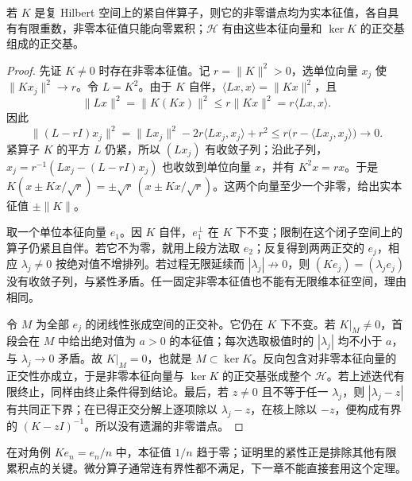 \begin{theorem}[紧自伴算子的谱结构]
若 \(K\) 是复 Hilbert 空间上的紧自伴算子，则它的非零谱点均为实本征值，各自具有有限重数，非零本征值只能向零累积；\(\mathcal H\) 有由这些本征向量和 \(\ker K\) 的正交基组成的正交基。
\end{theorem}

\begin{proof}
先证 \(K\ne0\) 时存在非零本征值。记 \(r=\|K\|^2>0\)，选单位向量 \(x_j\) 使 \(\|Kx_j\|^2\to r\)。令 \(L=K^2\)。由于 \(K\) 自伴，\(\langle Lx,x\rangle=\|Kx\|^2\)，且
\[
\|Lx\|^2=\|K(Kx)\|^2\le r\|Kx\|^2=r\langle Lx,x\rangle.
\]
因此
\[
\|(L-rI)x_j\|^2
=\|Lx_j\|^2-2r\langle Lx_j,x_j\rangle+r^2
\le r\bigl(r-\langle Lx_j,x_j\rangle\bigr)\longrightarrow0.
\]
紧算子 \(K\) 的平方 \(L\) 仍紧，所以 \((Lx_j)\) 有收敛子列；沿此子列，\(x_j=r^{-1}(Lx_j-(L-rI)x_j)\) 也收敛到单位向量 \(x\)，并有 \(K^2x=rx\)。于是 \(K(x\pm Kx/\sqrt r)=\pm\sqrt r\,(x\pm Kx/\sqrt r)\)。这两个向量至少一个非零，给出实本征值 \(\pm\|K\|\)。

取一个单位本征向量 \(e_1\)。因 \(K\) 自伴，\(e_1^\perp\) 在 \(K\) 下不变；限制在这个闭子空间上的算子仍紧且自伴。若它不为零，就用上段方法取 \(e_2\)；反复得到两两正交的 \(e_j\)，相应 \(\lambda_j\ne0\) 按绝对值不增排列。若过程无限延续而 \(|\lambda_j|\not\to0\)，则 \((Ke_j)=(\lambda_je_j)\) 没有收敛子列，与紧性矛盾。任一固定非零本征值也不能有无限维本征空间，理由相同。

令 \(M\) 为全部 \(e_j\) 的闭线性张成空间的正交补。它仍在 \(K\) 下不变。若 \(K|_M\ne0\)，首段会在 \(M\) 中给出绝对值为 \(a>0\) 的本征值；每次选取极值时的 \(|\lambda_j|\) 均不小于 \(a\)，与 \(\lambda_j\to0\) 矛盾。故 \(K|_M=0\)，也就是 \(M\subset\ker K\)。反向包含对非零本征向量的正交性亦成立，于是非零本征向量与 \(\ker K\) 的正交基张成整个 \(\mathcal H\)。若上述迭代有限终止，同样由终止条件得到结论。最后，若 \(z\ne0\) 且不等于任一 \(\lambda_j\)，则 \(|\lambda_j-z|\) 有共同正下界；在已得正交分解上逐项除以 \(\lambda_j-z\)，在核上除以 \(-z\)，便构成有界的 \((K-zI)^{-1}\)。所以没有遗漏的非零谱点。
\end{proof}

在对角例 \(Ke_n=e_n/n\) 中，本征值 \(1/n\) 趋于零；证明里的紧性正是排除其他有限累积点的关键。微分算子通常连有界性都不满足，下一章不能直接套用这个定理。


